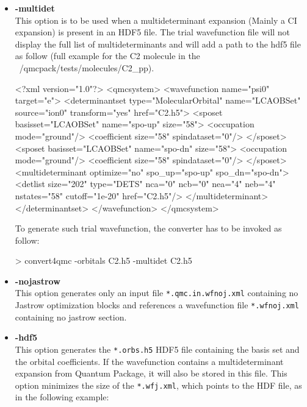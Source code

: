 \begin{itemize}
\item \textbf{-multidet}\\
This option is to be used when a multideterminant expansion (Mainly a CI expansion) is present in an HDF5 file. The trial wavefunction file will not display the full list of multideterminants and will add a path to the hdf5 file as follow (full example for the C2 molecule in the ~/qmcpack/tests/molecules/C2_pp).

\begin{shade}
<?xml version="1.0"?>
<qmcsystem>
  <wavefunction name="psi0" target="e">
    <determinantset type="MolecularOrbital" name="LCAOBSet" source="ion0" transform="yes" href="C2.h5">
      <sposet basisset="LCAOBSet" name="spo-up" size="58">
        <occupation mode="ground"/>
        <coefficient size="58" spindataset="0"/>
      </sposet>
      <sposet basisset="LCAOBSet" name="spo-dn" size="58">
        <occupation mode="ground"/>
        <coefficient size="58" spindataset="0"/>
      </sposet>
      <multideterminant optimize="no" spo_up="spo-up" spo_dn="spo-dn">
        <detlist size="202" type="DETS" nca="0" ncb="0" nea="4" neb="4" nstates="58" cutoff="1e-20" href="C2.h5"/>
      </multideterminant>
    </determinantset>
  </wavefunction>
</qmcsystem>
\end{shade}



To generate such trial wavefunction, the converter has to be invoked as follow:

\begin{shade}
> convert4qmc -orbitals C2.h5 -multidet C2.h5 
\end{shade}


\item \textbf{-nojastrow}\\
This option generates only an input file \texttt{*.qmc.in.wfnoj.xml} containing no Jastrow optimization blocks and references a wavefunction file \texttt{*.wfnoj.xml} containing no jastrow section.

\item \textbf{-hdf5}\\
This option generates the \texttt{*.orbs.h5} HDF5 file containing the basis set and the orbital coefficients. If the wavefunction contains a multideterminant expansion from Quantum Package, it will also be stored in this file. This option minimizes the size of the \texttt{*.wfj.xml}, which points to the HDF file, as in the following example: 


\end{itemize}
